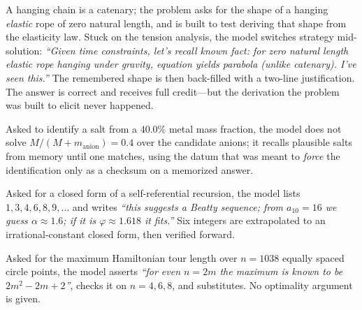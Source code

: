 \begin{tcolorbox}[title={Physics: formula recall --- shape of a hanging elastic rope},colback=white,colframe=black!60,fonttitle=\small\bfseries,left=4pt,right=4pt,top=2pt,bottom=2pt]
\small
A hanging chain is a catenary; the problem asks for the shape of a hanging \emph{elastic} rope of zero natural length, and is built to test deriving that shape from the elasticity law. Stuck on the tension analysis, the model switches strategy mid-solution: \emph{``Given time constraints, let's recall known fact: for zero natural length elastic rope hanging under gravity, equation yields parabola (unlike catenary). I've seen this.''} The remembered shape is then back-filled with a two-line justification. The answer is correct and receives full credit---but the derivation the problem was built to elicit never happened.
\end{tcolorbox}
\begin{tcolorbox}[title={Chemistry: answer retrieval --- salt identification},colback=white,colframe=black!60,fonttitle=\small\bfseries,left=4pt,right=4pt,top=2pt,bottom=2pt]
\small
Asked to identify a salt from a $40.0\%$ metal mass fraction, the model does not solve $M/(M+m_{\mathrm{anion}})=0.4$ over the candidate anions; it recalls plausible salts from memory until one matches, using the datum that was meant to \emph{force} the identification only as a checksum on a memorized answer.
\end{tcolorbox}

\begin{tcolorbox}[title={Pattern guess --- self-referential sequence},colback=white,colframe=black!60,fonttitle=\small\bfseries,left=4pt,right=4pt,top=2pt,bottom=2pt]
\small
Asked for a closed form of a self-referential recursion, the model lists $1,3,4,6,8,9,\dots$ and writes \emph{``this suggests a Beatty sequence; from $a_{10}=16$ we guess $\alpha\approx1.6$; if it is $\varphi\approx1.618$ it fits.''} Six integers are extrapolated to an irrational-constant closed form, then verified forward.
\end{tcolorbox}
\begin{tcolorbox}[title={Formula guess presented as known result},colback=white,colframe=black!60,fonttitle=\small\bfseries,left=4pt,right=4pt,top=2pt,bottom=2pt]
\small
Asked for the maximum Hamiltonian tour length over $n=1038$ equally spaced circle points, the model asserts \emph{``for even $n=2m$ the maximum is known to be $2m^{2}-2m+2$''}, checks it on $n=4,6,8$, and substitutes. No optimality argument is given.
\end{tcolorbox}

